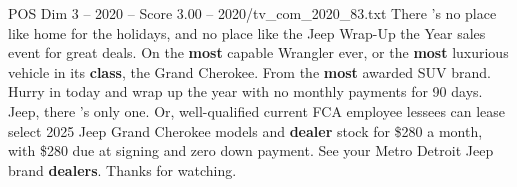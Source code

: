 \begin{textsample}{POS Dim 3 – 2020 – Score 3.00 – 2020/tv\_com\_2020\_83.txt}  \label{ex:f3_pos_061}
There 's no place like home for the holidays, and no place like the Jeep Wrap-Up the Year sales event for great deals.
On the \textbf{most} capable Wrangler ever, or the \textbf{most} luxurious vehicle in its \textbf{class}, the Grand Cherokee.
From the \textbf{most} awarded SUV brand.
Hurry in today and wrap up the year with no monthly payments for 90 days.
Jeep, there 's only one.
Or, well-qualified current FCA employee lessees can lease select 2025 Jeep Grand Cherokee models and \textbf{dealer} stock for \$280 a month, with \$280 due at signing and zero down payment.
See your Metro Detroit Jeep brand \textbf{dealers}.
Thanks for watching.

\end{textsample}
